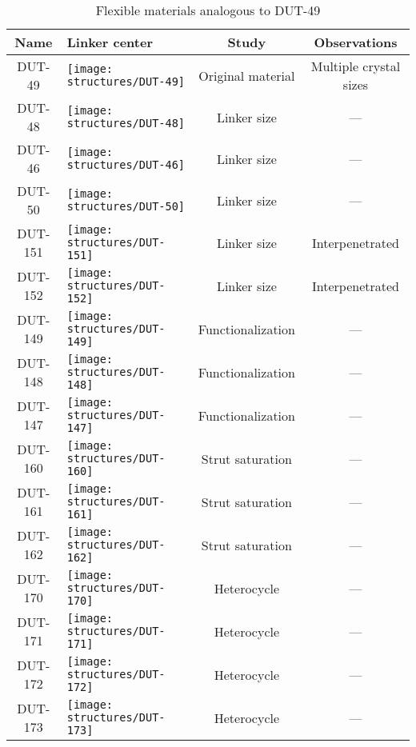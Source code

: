 \begin{table}[p]
    \centering %
	\caption{Flexible materials analogous to DUT-49}
    \small
	\begin{tabular}{c>{\centering\arraybackslash} m{6cm}cc}
		\toprule
	    \textbf{Name}
        & \textbf{Linker center}
        & \textbf{Study}
        & \textbf{Observations} \\
		\midrule
        DUT-49  & 
            \texttt{[image: structures/DUT-49]}
            & Original material & Multiple crystal sizes \\
            \midrule    
        DUT-48  & 
            \texttt{[image: structures/DUT-48]}
            & Linker size & --- \\
        DUT-46  & 
            \texttt{[image: structures/DUT-46]}
            & Linker size & --- \\
        DUT-50  & 
            \texttt{[image: structures/DUT-50]}
            & Linker size & --- \\
        DUT-151  & 
            \texttt{[image: structures/DUT-151]} 
            & Linker size & Interpenetrated \\
        DUT-152  & 
            \texttt{[image: structures/DUT-152]}
            & Linker size & Interpenetrated \\
            \midrule
        DUT-149  & 
            \texttt{[image: structures/DUT-149]}
            & Functionalization & --- \\
        DUT-148  & 
            \texttt{[image: structures/DUT-148]}
            & Functionalization & --- \\
        DUT-147  & 
            \texttt{[image: structures/DUT-147]}
            & Functionalization & --- \\
            \midrule
        DUT-160  & 
            \texttt{[image: structures/DUT-160]}
            & Strut saturation & --- \\
        DUT-161  & 
            \texttt{[image: structures/DUT-161]}
            & Strut saturation & --- \\
        DUT-162  & 
            \texttt{[image: structures/DUT-162]}
            & Strut saturation & --- \\
            \midrule
        DUT-170  & 
            \texttt{[image: structures/DUT-170]}
            & Heterocycle & --- \\
        DUT-171  & 
            \texttt{[image: structures/DUT-171]}
            & Heterocycle & --- \\
        DUT-172  & 
            \texttt{[image: structures/DUT-172]}
            & Heterocycle & --- \\
        DUT-173  & 
            \texttt{[image: structures/DUT-173]}
            & Heterocycle & --- \\
        \bottomrule
	\end{tabular}%
	\label{dut:tab:materials}
\end{table}%
